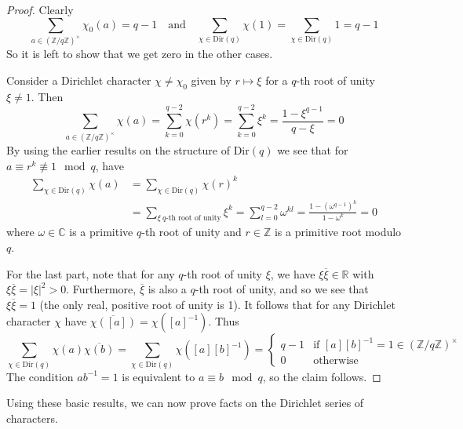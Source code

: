 \documentclass{scrartcl}
\newcommand{\R}{\mathbb{R}}
\newcommand{\Z}{\mathbb{Z}}
\newcommand{\C}{\mathbb{C}}
\newcommand{\units}{\times}
\theoremstyle{definition}
\begin{document}
\begin{proof}
    Clearly
    \begin{equation*}
        \sum_{a \in (\Z/q\Z)^\units} \chi_0(a) = q - 1 \quad \text{and} \quad \sum_{\chi \in \mathrm{Dir}(q)} \chi(1) = \sum_{\chi \in \mathrm{Dir}(q)} 1 = q - 1
    \end{equation*}
    So it is left to show that we get zero in the other cases.
    
    Consider a Dirichlet character $\chi \neq \chi_0$ given by $r \mapsto \xi$ for a $q$-th root of unity $\xi \neq 1$.
    Then
    \begin{equation*}
        \sum_{a \in (\Z/q\Z)^\units} \chi(a) = \sum_{k = 0}^{q - 2} \chi(r^k) = \sum_{k = 0}^{q - 2} \xi^k = \frac {1 - \xi^{q - 1}} {q - \xi} = 0 
    \end{equation*}
    By using the earlier results on the structure of $\mathrm{Dir}(q)$ we see that for $a \equiv r^k \not\equiv 1 \mod q$, have
    \begin{align*}
        \sum_{\chi \in \mathrm{Dir}(q)} \chi(a) &= \sum_{\chi \in \mathrm{Dir}(q)} \chi(r)^k \\
        &= \sum_{\xi \ \text{$q$-th root of unity}} \xi^k = \sum_{l = 0}^{q - 2} \omega^{kl} = \frac {1 - (\omega^{q - 1})^k} {1 - \omega^k} = 0 
    \end{align*}
    where $\omega \in \C$ is a primitive $q$-th root of unity and $r \in \Z$ is a primitive root modulo $q$.
    
    For the last part, note that for any $q$-th root of unity $\xi$, we have $\xi\overline{\xi} \in \R$ with $\xi\overline{\xi} = |\xi|^2 > 0$.
    Furthermore, $\overline{\xi}$ is also a $q$-th root of unity, and so we see that $\xi\overline{\xi} = 1$ (the only real, positive root of unity is 1).
    It follows that for any Dirichlet character $\chi$ have $\overline{\chi([a])} = \chi([a]^{-1})$.
    Thus
    \begin{equation*}
        \sum_{\chi \in \mathrm{Dir}(q)} \chi(a)\overline{\chi(b)} = \sum_{\chi \in \mathrm{Dir}(q)} \chi([a][b]^{-1}) = \begin{cases}
            q - 1 & \text{if $[a][b]^{-1} = 1 \in (\Z/q\Z)^\units$} \\
            0 & \text{otherwise}
        \end{cases}
    \end{equation*}
    The condition $ab^{-1} = 1$ is equivalent to $a \equiv b \mod q$, so the claim follows.
\end{proof}
Using these basic results, we can now prove facts on the Dirichlet series of characters.
\end{document}
